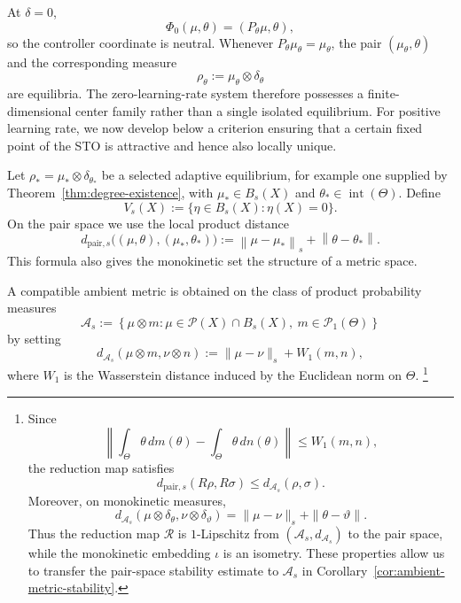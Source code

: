 \documentclass[11pt]{article}
\theoremstyle{definition}
\theoremstyle{remark}
\newcommand{\norm}[1]{\left\lVert #1\right\rVert}
\newcommand{\ThetaSet}{\Theta}
\begin{document}
At \(\delta=0\),
\[
  \Phi_0(\mu,\theta)=(P_\theta\mu,\theta),
\]
so the controller coordinate is neutral.  Whenever
\(P_\theta\mu_\theta=\mu_\theta\), the pair \((\mu_\theta,\theta)\) and the
corresponding measure
\begin{equation}
  \rho_\theta:=\mu_\theta\otimes\delta_\theta
  \label{eq:equilibrium-family}
\end{equation}
are equilibria.  The zero-learning-rate system therefore possesses a finite-dimensional center family rather than a single isolated equilibrium.
For positive learning rate, we now develop below a criterion ensuring that a certain fixed point of the STO is attractive and hence also locally unique.

Let \(\rho_*=\mu_*\otimes\delta_{\theta_*}\) be a selected adaptive
equilibrium, for example one supplied by
Theorem~\ref{thm:degree-existence}, with \(\mu_*\in B_s(X)\) and
\(\theta_*\in\operatorname{int}(\ThetaSet)\).  Define
\begin{equation}
  V_s(X):=\{\eta\in B_s(X):\eta(X)=0\}.
  \label{eq:zero-mass-space}
\end{equation}
On the pair space we use the local product distance
\begin{equation}
  d_{\mathrm{pair},s}
  \bigl((\mu,\theta),(\mu_*,\theta_*)\bigr)
  :=\norm{\mu-\mu_*}_s+\norm{\theta-\theta_*}.
  \label{eq:pair-strong-distance}
\end{equation}
This formula also gives the monokinetic set the structure of a metric space.

A compatible ambient metric is obtained on the class of product probability measures
\[
  \mathcal A_s
  :=
  \left\{
    \mu\otimes m:
    \mu\in\mathcal P(X)\cap B_s(X),\
    m\in\mathcal P_1(\Theta)
  \right\}
\]
by setting
\[
  d_{\mathcal A_s}(\mu\otimes m,\nu\otimes n)
  :=
  \|\mu-\nu\|_s+W_1(m,n),
\]
where $W_1$ is the Wasserstein distance induced by the
Euclidean norm on $\Theta$.
\footnote{
Since
\[
  \left\|\int_\Theta\theta\,dm(\theta)
          -\int_\Theta\theta\,dn(\theta)\right\|
  \leq W_1(m,n),
\]
the reduction map satisfies
\[
  d_{\mathrm{pair},s}(R\rho,R\sigma)
  \leq d_{\mathcal A_s}(\rho,\sigma).
\]
Moreover, on monokinetic measures,
\[
  d_{\mathcal A_s}
  (\mu\otimes\delta_\theta,\nu\otimes\delta_\vartheta)
  =
  \|\mu-\nu\|_s+\|\theta-\vartheta\|.
\]
Thus the reduction map $\mathcal R$ is $1$-Lipschitz
from $(\mathcal A_s,d_{\mathcal A_s})$ to the pair space,
while the monokinetic embedding $\iota$ is an isometry.
These properties allow us to transfer the pair-space
stability estimate to $\mathcal A_s$ in
Corollary~\ref{cor:ambient-metric-stability}.}
\end{document}
